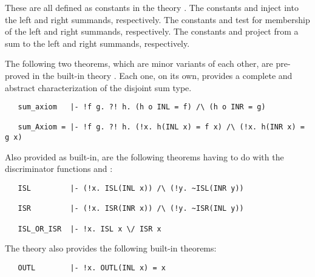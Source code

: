 {{\noindent These are all defined as constants in the theory .  The
constants  and  inject into the left and right summands,
respectively. The constants  and  test for membership of the
left and right summands, respectively. The constants  and 
project from a sum to the left and right summands, respectively.

The following two theorems, which are minor variants of each other, are
pre-proved in the built-in theory . Each one, on its own, provides a
complete and abstract characterization of the disjoint sum type.

\begin{hol}
\begin{verbatim}
   sum_axiom   |- !f g. ?! h. (h o INL = f) /\ (h o INR = g)

   sum_Axiom = |- !f g. ?! h. (!x. h(INL x) = f x) /\ (!x. h(INR x) = g x)
\end{verbatim}\end{hol}

\noindent Also provided as built-in, are the following theorems having to
do with the discriminator functions  and :

\begin{hol}
\begin{verbatim}
   ISL         |- (!x. ISL(INL x)) /\ (!y. ~ISL(INR y))

   ISR         |- (!x. ISR(INR x)) /\ (!y. ~ISR(INL y))

   ISL_OR_ISR  |- !x. ISL x \/ ISR x
\end{verbatim}\end{hol}

\noindent The  theory also provides the following built-in theorems:

\begin{hol}
\begin{verbatim}
   OUTL        |- !x. OUTL(INL x) = x


\end{verbatim}
\end{hol}}}
